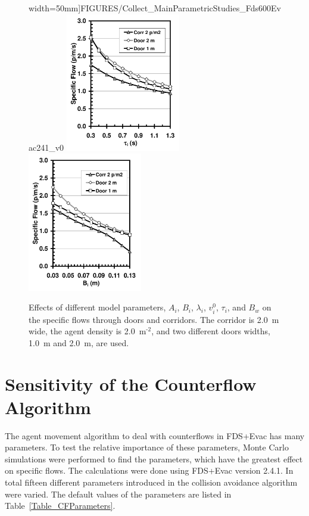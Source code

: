 \documentclass[12pt,a4paper,final,twoside]{stylevk}
\begin{document}
\begin{figure}[!tb]
{  width=50mm]{FIGURES/Collect_MainParametricStudies_Fds600Evac241_v0}  
  \includegraphics[clip=true,
  width=50mm]{FIGURES/Collect_MainParametricStudies_Fds600Evac241_Tau} 
  \includegraphics[clip=true,
  width=50mm]{FIGURES/Collect_MainParametricStudies_Fds600Evac241_B} }
  \caption{Effects of different model parameters, $A_i$, $B_i$,
    $\lambda_i$, $v^0_i$, $\tau_i$, and $B_w$ on the specific flows
    through doors and corridors.  The corridor is 2.0~m wide, the
    agent density is 2.0~$\mathrm{ \textrm{m}^\textrm{-2} }$, and two
    different doors widths, 1.0~m and 2.0~m, are used.
    \protect\hspace{200mm}}\label{Fig_Door1}
\end{figure}
%


\section{Sensitivity of the Counterflow Algorithm}\label{Sec_CFSensi}

\noindent The agent movement algorithm to deal with counterflows in
FDS+Evac has many parameters.  To test the relative importance of
these parameters, Monte Carlo simulations were performed to find the
parameters, which have the greatest effect on specific flows.  The
calculations were done using FDS+Evac version 2.4.1.  In total fifteen
different parameters introduced in the collision avoidance algorithm
were varied.  The default values of the parameters are listed in
Table~\ref{Table_CFParameters}.
\end{document}
